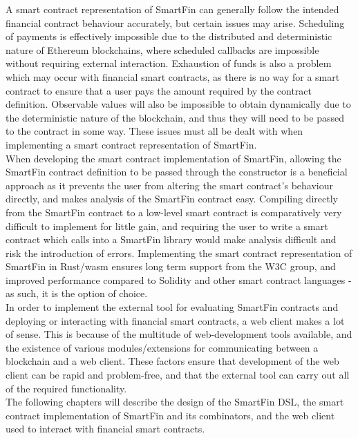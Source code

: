 A smart contract representation of SmartFin can generally follow the intended financial contract behaviour accurately, but certain issues may arise. Scheduling of payments is effectively impossible due to the distributed and deterministic nature of Ethereum blockchains, where scheduled callbacks are impossible without requiring external interaction. Exhaustion of funds is also a problem which may occur with financial smart contracts, as there is no way for a smart contract to ensure that a user pays the amount required by the contract definition. Observable values will also be impossible to obtain dynamically due to the deterministic nature of the blockchain, and thus they will need to be passed to the contract in some way. These issues must all be dealt with when implementing a smart contract representation of SmartFin. \\

When developing the smart contract implementation of SmartFin, allowing the SmartFin contract definition to be passed through the constructor is a beneficial approach as it prevents the user from altering the smart contract's behaviour directly, and makes analysis of the SmartFin contract easy. Compiling directly from the SmartFin contract to a low-level smart contract is comparatively very difficult to implement for little gain, and requiring the user to write a smart contract which calls into a SmartFin library would make analysis difficult and risk the introduction of errors. Implementing the smart contract representation of SmartFin in Rust/wasm ensures long term support from the W3C group, and improved performance compared to Solidity and other smart contract languages - as such, it is the option of choice. \\

In order to implement the external tool for evaluating SmartFin contracts and deploying or interacting with financial smart contracts, a web client makes a lot of sense. This is because of the multitude of web-development tools available, and the existence of various modules/extensions for communicating between a blockchain and a web client. These factors ensure that development of the web client can be rapid and problem-free, and that the external tool can carry out all of the required functionality. \\

The following chapters will describe the design of the SmartFin DSL, the smart contract implementation of SmartFin and its combinators, and the web client used to interact with financial smart contracts.
